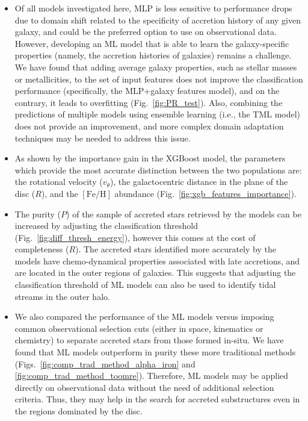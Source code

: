 \begin{itemize}
    \item Of all models investigated here,  MLP is less sensitive to performance drops due to domain shift related to the specificity of accretion history of any given galaxy, and could be the preferred option to use on observational data. However, developing an ML model that is able to learn the galaxy-specific properties (namely, the accretion histories of galaxies) remains a challenge. We have found that adding average galaxy properties, such as stellar masses or metallicities, to the set of input features does not improve the classification performance (specifically, the MLP+galaxy features model), and on the contrary, it leads to overfitting (Fig.~\ref{fig:PR_test}).  Also, combining the predictions of multiple models using ensemble learning (i.e., the TML model) does not provide an improvement, and more complex domain adaptation techniques may be needed to address this issue.

    \item As shown by the importance gain in the XGBoost model, the parameters which provide the most accurate distinction between the two populations are: the rotational velocity ($v_{\theta}$), the galactocentric distance in the plane of the disc ($R$), and the $[\mathrm{Fe}/\mathrm{H}]$ abundance (Fig.~\ref{fig:xgb_features_importance}).

    \item The purity ($P$) of the sample of accreted stars retrieved by the models can be increased by adjusting the classification threshold (Fig.~\ref{fig:diff_thresh_energy}), however this comes at the cost of completeness ($R$). The accreted stars identified more accurately by the models have chemo-dynamical properties associated with late accretions, and are located in the outer regions of galaxies. This suggests that adjusting the classification threshold of ML models can also be used to identify tidal streams in the outer halo.

    \item We also compared the performance of the ML models versus  imposing common observational selection cuts (either in space, kinematics or chemistry) to separate accreted stars from those formed in-situ. We have found that ML models outperform in purity these more traditional methods (Figs.~\ref{fig:comp_trad_method_alpha_iron} and \ref{fig:comp_trad_method_toomre}). Therefore, ML models may be applied directly on observational data without the need of additional selection criteria. Thus, they may help in the search for accreted substructures  even in the regions dominated by the disc.


\end{itemize}
